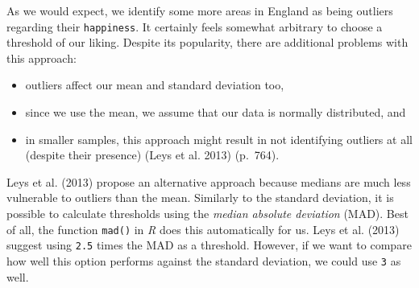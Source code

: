 \documentclass[
  letterpaper,
]{krantz}
\makeatletter
\newenvironment{Shaded}{\begin{snugshade}}{\end{snugshade}}
\newcommand{\AttributeTok}[1]{\textcolor[rgb]{0.40,0.45,0.13}{#1}}
\newcommand{\CommentTok}[1]{\textcolor[rgb]{0.37,0.37,0.37}{#1}}
\newcommand{\ConstantTok}[1]{\textcolor[rgb]{0.56,0.35,0.01}{#1}}
\newcommand{\DecValTok}[1]{\textcolor[rgb]{0.68,0.00,0.00}{#1}}
\newcommand{\FunctionTok}[1]{\textcolor[rgb]{0.28,0.35,0.67}{#1}}
\newcommand{\NormalTok}[1]{\textcolor[rgb]{0.00,0.23,0.31}{#1}}
\newcommand{\OtherTok}[1]{\textcolor[rgb]{0.00,0.23,0.31}{#1}}
\newcommand{\SpecialCharTok}[1]{\textcolor[rgb]{0.37,0.37,0.37}{#1}}
\newcommand{\StringTok}[1]{\textcolor[rgb]{0.13,0.47,0.30}{#1}}
\newenvironment{kframe}{%
\medskip{}
\setlength{\fboxsep}{.8em}
 \def\at@end@of@kframe{}%
 \ifinner\ifhmode%
  \def\at@end@of@kframe{\end{minipage}}%
  \begin{minipage}{\columnwidth}%
 \fi\fi%
 \def\FrameCommand##1{\hskip\@totalleftmargin \hskip-\fboxsep
 \colorbox{shadecolor}{##1}\hskip-\fboxsep
     \hskip-\linewidth \hskip-\@totalleftmargin \hskip\columnwidth}%
 \MakeFramed {\advance\hsize-\width
   \@totalleftmargin\z@ \linewidth\hsize
   \@setminipage}}%
 {\par\unskip\endMakeFramed%
 \at@end@of@kframe}
\renewenvironment{Shaded}{\begin{kframe}}{\end{kframe}}
\makeatother
\begin{document}
As we would expect, we identify some more areas in England as being
outliers regarding their \texttt{happiness}. It certainly feels somewhat
arbitrary to choose a threshold of our liking. Despite its popularity,
there are additional problems with this approach:

\begin{itemize}
\item
  outliers affect our mean and standard deviation too,
\item
  since we use the mean, we assume that our data is normally
  distributed, and
\item
  in smaller samples, this approach might result in not identifying
  outliers at all (despite their presence) (Leys et al. 2013) (p.~764).
\end{itemize}

Leys et al. (2013) propose an alternative approach because medians are
much less vulnerable to outliers than the mean. Similarly to the
standard deviation, it is possible to calculate thresholds using the
\emph{median absolute deviation} (MAD). Best of all, the function
\texttt{mad()} in \emph{R} does this automatically for us. Leys et al.
(2013) suggest using \texttt{2.5} times the MAD as a threshold. However,
if we want to compare how well this option performs against the standard
deviation, we could use \texttt{3} as well.

\begin{Shaded}
\end{Shaded}
\end{document}
